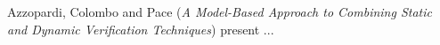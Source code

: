 

Azzopardi, Colombo and Pace
\cite{isola-2016-azzopardi}
({\em A Model-Based Approach to Combining Static
and Dynamic Verification Techniques}) 
present ...
